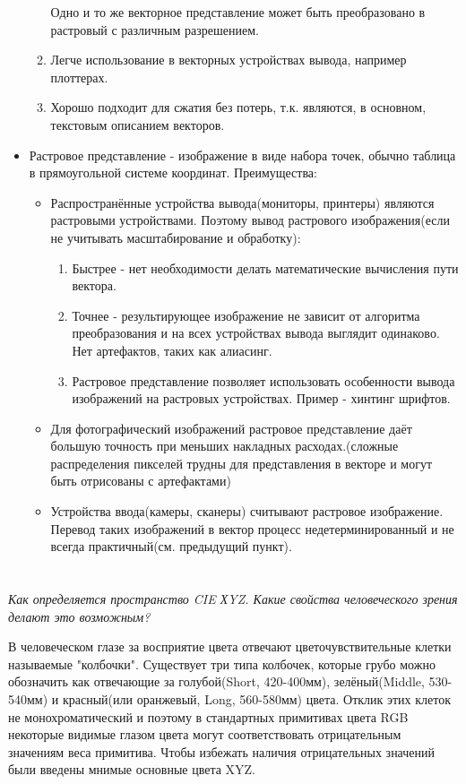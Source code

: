 \documentclass[11pt]{article}
\begin{document}
\begin{itemize}
\begin{enumerate}
    Одно и то же векторное представление может быть преобразовано в растровый с различным разрешением.
    \item Легче использование в векторных устройствах вывода, например плоттерах.
    \item Хорошо подходит для сжатия без потерь, т.к. являются, в основном, текстовым описанием векторов.
  \end{enumerate}
  \item Растровое представление - изображение в виде набора точек, обычно таблица в прямоугольной системе координат. Преимущества:
  \begin{itemize}
    \item Распространённые устройства вывода(мониторы, принтеры) являются растровыми устройствами. Поэтому вывод растрового изображения(если не учитывать масштабирование и обработку):
    \begin{enumerate}
      \item Быстрее - нет необходимости делать математические вычисления пути вектора.
      \item Точнее - результирующее изображение не зависит от алгоритма преобразования и на всех устройствах вывода выглядит одинаково. Нет артефактов, таких как алиасинг.
      \item Растровое представление позволяет использовать особенности вывода изображений на растровых устройствах. Пример  - хинтинг шрифтов.
    \end{enumerate}
    \item Для фотографический изображений растровое представление даёт большую точность при меньших накладных расходах.(сложные распределения пикселей трудны для представления в векторе и могут быть отрисованы с артефактами)
    \item Устройства ввода(камеры, сканеры) считывают растровое изображение. Перевод таких изображений в вектор процесс недетерминированный и не всегда практичный(см. предыдущий пункт).
  \end{itemize}
\end{itemize}

\section{}
\textit{Как определяется пространство CIE ХYZ. Какие свойства человеческого зрения делают это возможным?}

В человеческом глазе за восприятие цвета отвечают цветочувствительные клетки называемые "колбочки". Существует три типа колбочек, которые грубо можно обозначить как отвечающие за голубой(Short, 420-400мм), зелёный(Middle, 530-540мм) и красный(или оранжевый, Long, 560-580мм) цвета. Отклик этих клеток не монохроматический и поэтому в стандартных примитивах цвета RGB  некоторые видимые глазом цвета могут соответствовать отрицательным значениям веса примитива. Чтобы избежать наличия отрицательных значений были введены мнимые основные цвета XYZ. 
\end{document}
